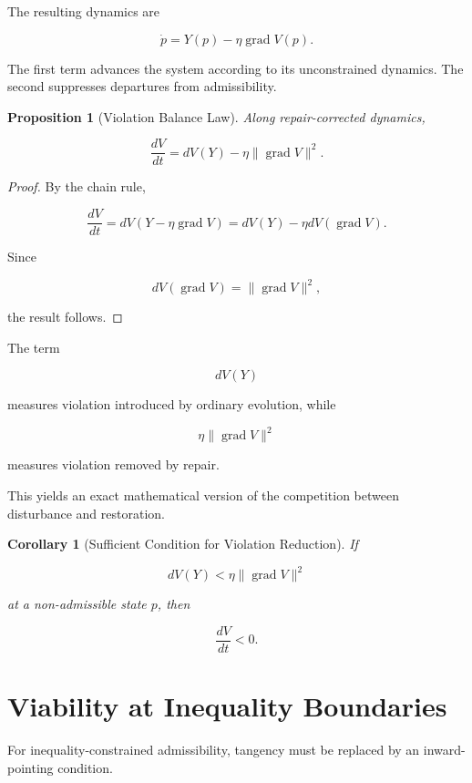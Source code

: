 \documentclass[11pt,oneside]{book}
\numberwithin{equation}{chapter}
\theoremstyle{definition}
\theoremstyle{plain}
\newtheorem{proposition}[definition]{Proposition}
\newtheorem{corollary}[definition]{Corollary}
\DeclareMathOperator{\grad}{grad}
\begin{document}
The resulting dynamics are

\[
\boxed{
\dot p
=
Y(p)
-
\eta\grad V(p).
}
\]

The first term advances the system according to its unconstrained dynamics.
The second suppresses departures from admissibility.

\begin{proposition}[Violation Balance Law]

Along repair-corrected dynamics,

\[
\frac{dV}{dt}
=
dV(Y)
-
\eta
\|\grad V\|^2.
\]

\end{proposition}

\begin{proof}

By the chain rule,

\[
\frac{dV}{dt}
=
dV
\left(
Y-\eta\grad V
\right)
=
dV(Y)
-
\eta dV(\grad V).
\]

Since

\[
dV(\grad V)
=
\|\grad V\|^2,
\]

the result follows.

\end{proof}

The term

\[
dV(Y)
\]

measures violation introduced by ordinary evolution, while

\[
\eta\|\grad V\|^2
\]

measures violation removed by repair.

This yields an exact mathematical version of the competition between
disturbance and restoration.

\begin{corollary}[Sufficient Condition for Violation Reduction]

If

\[
dV(Y)
<
\eta
\|\grad V\|^2
\]

at a non-admissible state \(p\), then

\[
\frac{dV}{dt}<0.
\]

\end{corollary}

\section{Viability at Inequality Boundaries}

For inequality-constrained admissibility, tangency must be replaced by an
inward-pointing condition.
\end{document}
